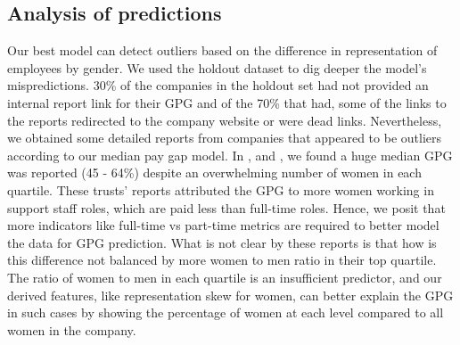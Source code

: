 \subsection{Analysis of predictions}
Our best model can detect outliers based on the difference in representation of employees by gender. We used the holdout dataset to dig deeper the model's mispredictions. 30\% of the companies in the holdout set had not provided an internal report link for their GPG and of the 70\% that had, some of the links to the reports redirected to the company website or were dead links. Nevertheless, we obtained some detailed reports from companies that appeared to be outliers according to our median pay gap model. In \cite{PenkValleyAcademyTrust2019}, \cite{Aquinastrust2019} and \cite{ElevateMultiAcademyTrust2020}, we found a huge median GPG was reported (45 - 64\%) despite an overwhelming number of women in each quartile. These trusts' reports attributed the GPG to more women working in support staff roles, which are paid less than full-time roles. Hence, we posit that more indicators like full-time vs part-time metrics are required to better model the data for GPG prediction. What is not clear by these reports is that how is this difference not balanced by more women to men ratio in their top quartile. The ratio of women to men in each quartile is an insufficient predictor, and our derived features, like representation skew for women, can better explain the GPG in such cases by showing the percentage of women at each level compared to all women in the company.


